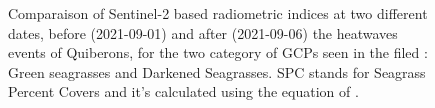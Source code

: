 \documentclass[
  number]{elsarticle}
\begin{document}
\label{cell-fig-NDVI_GLI_SPC}
\begin{figure}[H]


\caption{\label{fig-NDVI_GLI_SPC}Comparaison of Sentinel-2 based
radiometric indices at two different dates, before (2021-09-01) and
after (2021-09-06) the heatwaves events of Quiberons, for the two
category of GCPs seen in the filed : Green seagrasses and Darkened
Seagrasses. SPC stands for Seagrass Percent Covers and it's calculated
using the equation of \citep{zoffoli2020sentinel}.}

\end{figure}%


\renewcommand\refname{Bibliography}
  
\end{document}
